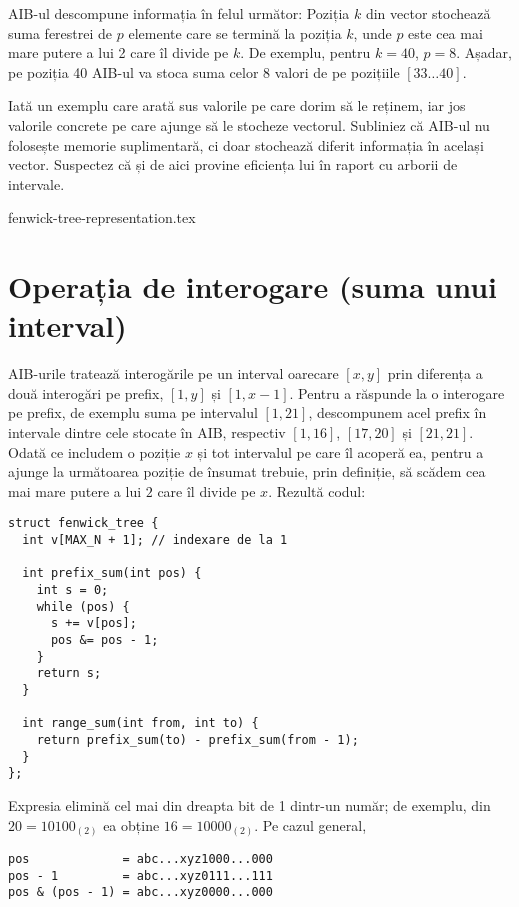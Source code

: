 AIB-ul descompune informația în felul următor: Poziția $k$ din vector stochează suma ferestrei de $p$ elemente care se termină la poziția $k$, unde $p$ este cea mai mare putere a lui 2 care îl divide pe $k$. De exemplu, pentru $k = 40$, $p = 8$. Așadar, pe poziția 40 AIB-ul va stoca suma celor 8 valori de pe pozițiile $[33 \dots 40]$.

Iată un exemplu care arată sus valorile pe care dorim să le reținem, iar jos valorile concrete pe care ajunge să le stocheze vectorul. Subliniez că AIB-ul nu folosește memorie suplimentară, ci doar stochează diferit informația în același vector. Suspectez că și de aici provine eficiența lui în raport cu arborii de intervale.

{fenwick-tree-representation.tex}

\section{Operația de interogare (suma unui interval)}

AIB-urile tratează interogările pe un interval oarecare $[x, y]$ prin diferența a două interogări pe prefix, $[1, y]$ și $[1, x - 1]$. Pentru a răspunde la o interogare pe prefix, de exemplu suma pe intervalul $[1, 21]$, descompunem acel prefix în intervale dintre cele stocate în AIB, respectiv $[1,16]$, $[17, 20]$ și $[21, 21]$. Odată ce includem o poziție $x$ și tot intervalul pe care îl acoperă ea, pentru a ajunge la următoarea poziție de însumat trebuie, prin definiție, să scădem cea mai mare putere a lui $2$ care îl divide pe $x$. Rezultă codul:

\begin{verbatim}
struct fenwick_tree {
  int v[MAX_N + 1]; // indexare de la 1

  int prefix_sum(int pos) {
    int s = 0;
    while (pos) {
      s += v[pos];
      pos &= pos - 1;
    }
    return s;
  }

  int range_sum(int from, int to) {
    return prefix_sum(to) - prefix_sum(from - 1);
  }
};
\end{verbatim}

Expresia  elimină cel mai din dreapta bit de 1 dintr-un număr; de exemplu, din $20 = 10100_{(2)}$ ea obține $16 = 10000_{(2)}$. Pe cazul general,

\begin{verbatim}
pos             = abc...xyz1000...000
pos - 1         = abc...xyz0111...111
pos & (pos - 1) = abc...xyz0000...000
\end{verbatim}

